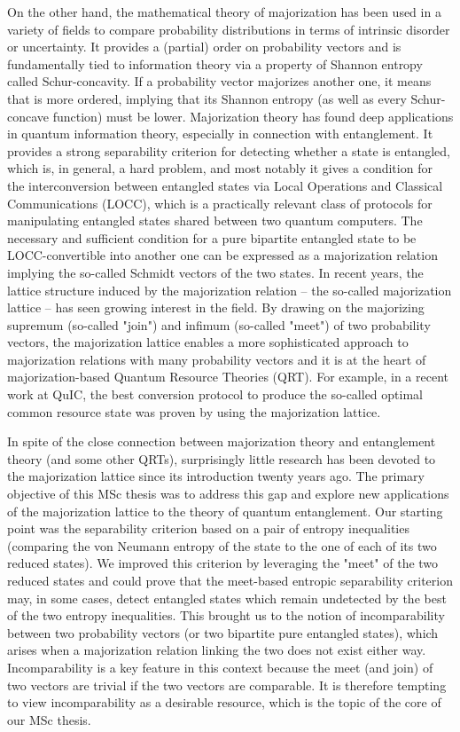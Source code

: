 On the other hand, the mathematical theory of majorization has been used in a variety of fields to compare probability distributions in terms of intrinsic disorder or uncertainty. It provides a (partial) order on probability vectors and is fundamentally tied to information theory via a property of Shannon entropy called Schur-concavity. If a probability vector majorizes another one, it means that is more ordered, implying that its Shannon entropy (as well as every Schur-concave function) must be lower. Majorization theory has found deep applications in quantum information theory, especially in connection with entanglement. It provides a strong separability criterion for detecting whether a state is entangled, which is, in general, a hard problem, and most notably it gives a condition for the interconversion between entangled states via Local Operations and Classical Communications (LOCC), which is a practically relevant class of protocols for manipulating entangled states shared between two quantum computers. The necessary and sufficient condition for a pure bipartite entangled state to be LOCC-convertible into another one can be expressed as a majorization relation implying the so-called Schmidt vectors of the two states. In recent years, the lattice structure induced by the majorization relation – the so-called majorization lattice – has seen growing interest in the field. By drawing on the majorizing supremum (so-called "join") and infimum (so-called "meet") of two probability vectors, the majorization lattice enables a more sophisticated approach to majorization relations with many probability vectors and it is at the heart of majorization-based Quantum Resource Theories (QRT). For example, in a recent work at QuIC, the best conversion protocol to produce the so-called optimal common resource state was proven by using the majorization lattice.

In spite of the close connection between majorization theory and entanglement theory (and some other QRTs), surprisingly little research has been devoted to the majorization lattice since its introduction twenty years ago. The primary objective of this MSc thesis was to address this gap and explore new applications of the majorization lattice to the theory of quantum entanglement. Our starting point was the separability criterion based on a pair of entropy inequalities (comparing the von Neumann entropy of the state to the one of each of its two reduced states). We improved this criterion by leveraging the "meet" of the two reduced states and could prove that the meet-based entropic separability criterion may, in some cases, detect entangled states which remain undetected by the best of the two entropy inequalities. This brought us to the notion of incomparability between two probability vectors (or two bipartite pure entangled states), which arises when a majorization relation linking the two does not exist either way. Incomparability is a key feature in this context because the meet (and join) of two vectors are trivial if the two vectors are comparable. It is therefore tempting to view incomparability as a desirable resource, which is the topic of the core of our MSc thesis.

